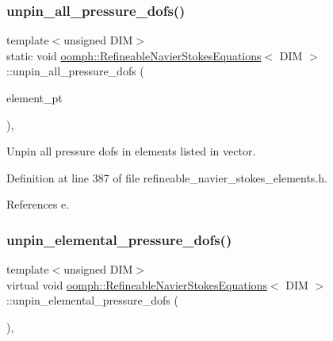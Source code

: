 \subsubsection{\texorpdfstring{unpin\+\_\+all\+\_\+pressure\+\_\+dofs()}{unpin\_all\_pressure\_dofs()}}
{\footnotesize\ttfamily template$<$unsigned D\+IM$>$ \\
static void \hyperlink{classoomph_1_1RefineableNavierStokesEquations}{oomph\+::\+Refineable\+Navier\+Stokes\+Equations}$<$ D\+IM $>$\+::unpin\+\_\+all\+\_\+pressure\+\_\+dofs (\begin{DoxyParamCaption}\item[{const \hyperlink{classoomph_1_1Vector}{Vector}$<$ \hyperlink{classoomph_1_1GeneralisedElement}{Generalised\+Element} $\ast$$>$ \&}]{element\+\_\+pt }\end{DoxyParamCaption})\hspace{0.3cm}{\ttfamily [inline]}, {\ttfamily [static]}}



Unpin all pressure dofs in elements listed in vector. 



Definition at line 387 of file refineable\+\_\+navier\+\_\+stokes\+\_\+elements.\+h.



References e.

\mbox{\label{classoomph_1_1RefineableNavierStokesEquations_acd0b56b66d250625401a9f6578f8bebc}} 
\subsubsection{\texorpdfstring{unpin\+\_\+elemental\+\_\+pressure\+\_\+dofs()}{unpin\_elemental\_pressure\_dofs()}}
{\footnotesize\ttfamily template$<$unsigned D\+IM$>$ \\
virtual void \hyperlink{classoomph_1_1RefineableNavierStokesEquations}{oomph\+::\+Refineable\+Navier\+Stokes\+Equations}$<$ D\+IM $>$\+::unpin\+\_\+elemental\+\_\+pressure\+\_\+dofs (\begin{DoxyParamCaption}{ }\end{DoxyParamCaption})\hspace{0.3cm}{\ttfamily [protected]}, {}}



